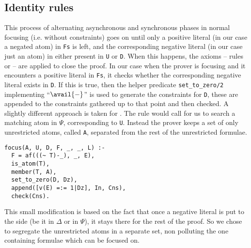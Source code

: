 \subsection{Identity rules}\label{sec:identity}
This process of alternating asynchronous and synchronous phases in normal focusing (i.e. without constraints) goes on until only a positive literal (in our case a negated atom) in \texttt{Fs} is left, and the corresponding negative literal (in our case just an atom) in either present in \texttt{U} or \texttt{D}.
When this happens, the axioms -- rules \derRule[A]{\displayid[1]} or \derRule[A]{\displayid[2]} -- are applied to close the proof.
In our case when the prover is focusing and it encounters a positive literal in \texttt{Fs}, it checks whether the corresponding negative literal exists in \texttt{D}.
If this is true, then the helper predicate \texttt{set\_to\_zero/2} implementing ``$\avail{-}$'' is used to generate the constraints for \texttt{D}, these are appended to the constraints gathered up to that point and then checked.
A slightly different approach is taken for \derRule{\displayid[2]}.
The rule would call for us to search a matching atom in $\Psi$, corresponding to \texttt{U}.
Instead the prover keeps a set of only unrestricted atoms, called \texttt{A}, separated from the rest of the unrestricted formulae.
\begin{verbatim}
focus(A, U, D, F, _, _, L) :-
  F = af(((~ T)-_), _, E),
  is_atom(T),
  member(T, A),
  set_to_zero(D, Dz),
  append([v(E) =:= 1|Dz], In, Cns),
  check(Cns).
\end{verbatim}
This small modification is based on the fact that once a negative literal is put to the side (be it in $\Delta$ or in $\Psi$), it stays there for the rest of the proof.
So we chose to segregate the unrestricted atoms in a separate set, non polluting the one containing formulae which can be focused on.

